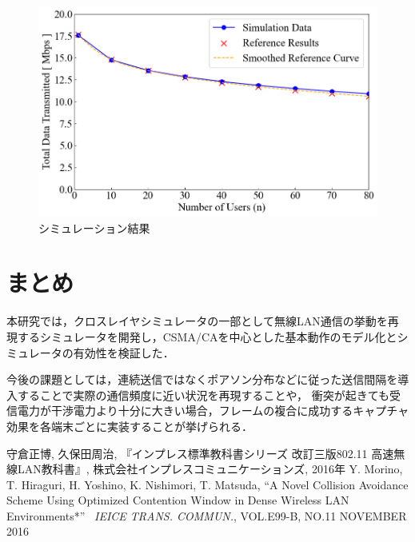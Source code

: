 \documentclass[a4paper, 10pt]{ltjsarticle}
\begin{document}
\begin{figure}[t]
  \centering
  \includegraphics[width=1\columnwidth]{./assets/g3.png}
  \caption{シミュレーション結果}
  \label{fig:simulation-result}
\end{figure}

\section{まとめ}
本研究では，クロスレイヤシミュレータの一部として無線LAN通信の挙動を再現するシミュレータを開発し，CSMA/CAを中心とした基本動作のモデル化とシミュレータの有効性を検証した．

今後の課題としては，連続送信ではなくポアソン分布などに従った送信間隔を導入することで実際の通信頻度に近い状況を再現することや，
衝突が起きても受信電力が干渉電力より十分に大きい場合，フレームの複合に成功するキャプチャ効果を各端末ごとに実装することが挙げられる．







\begin{thebibliography}{9}
  守倉正博, 久保田周治, 『インプレス標準教科書シリーズ 改訂三版802.11 高速無線LAN教科書』, 株式会社インプレスコミュニケーションズ, 2016年
  Y. Morino, T. Hiraguri, H. Yoshino, K. Nishimori, T. Matsuda, ``A Novel Collision Avoidance Scheme Using Optimized Contention Window in Dense Wireless LAN Environments*'' \, \textit{IEICE TRANS. COMMUN.}, VOL.E99-B, NO.11 NOVEMBER 2016
\end{thebibliography}
\end{document}
